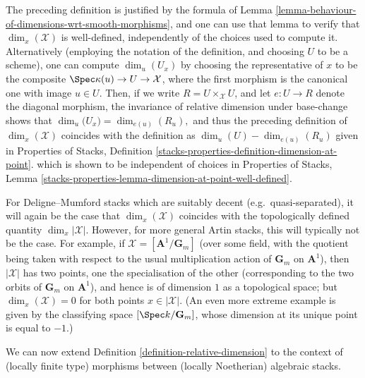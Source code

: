 \begin{remark}
\label{remark-computing-dims}
The preceding definition is justified by the formula of
Lemma \ref{lemma-behaviour-of-dimensions-wrt-smooth-morphisms},
and one can use that lemma to verify that $\dim_x(\mathcal{X})$ is well-defined,
independently of the choices used to compute it.
Alternatively (employing the notation of the definition, and choosing
$U$ to be a scheme),
one can compute $\dim_u(U_x)$ by choosing
the representative of $x$ to  be the composite
$\Spec \kappa(u) \to U \to \mathcal{X}$, where the first morphism is the
canonical
one with image $u \in U$.
Then, if we write $R = U\times_{\mathcal{X}} U$, and let $e: U \to R$ denote
the
diagonal morphism, the invariance of relative dimension under base-change
shows that $\dim_u \bigl(U_x) = \dim_{e(u)}(R_u),$
and thus the preceding definition of $\dim_x (\mathcal{X})$ coincides
with the definition as $\dim_u (U) - \dim_{e(u)}(R_u)$ given in
Properties of Stacks, Definition
\ref{stacks-properties-definition-dimension-at-point}.
which is shown to be independent of choices in
Properties of Stacks, Lemma
\ref{stacks-properties-lemma-dimension-at-point-well-defined}.
\end{remark}

\begin{remark}
\label{remark-dimension-DM}
For Deligne--Mumford stacks which are suitably decent
(e.g.\ quasi-separated),
it will again be the case that $\dim_x(\mathcal{X})$ coincides with the
topologically
defined quantity $\dim_x |\mathcal{X}|$.  However, for more general Artin
stacks,
this will typically not be the case.  For example, if
$\mathcal{X} = [\mathbf{A}^1/\mathbf{G}_m]$
(over some field, with the quotient being taken with
respect to the usual multiplication action of $\mathbf{G}_m$ on $\mathbf{A}^1$),
then  $|\mathcal{X}|$ has two points, one the specialisation of the other
(corresponding
to the two orbits of $\mathbf{G}_m$ on $\mathbf{A}^1$), and hence is of
dimension $1$ as
a topological space; but $\dim_x (\mathcal{X}) = 0$ for both points
$x \in |\mathcal{X}|$.
(An even more extreme example is given by the classifying space
$[\Spec k/\mathbf{G}_m]$, whose dimension at its unique point
is equal to $-1$.)
\end{remark}

\noindent
We can now extend Definition \ref{definition-relative-dimension}
to the context of (locally finite type)
morphisms between (locally Noetherian) algebraic stacks.

